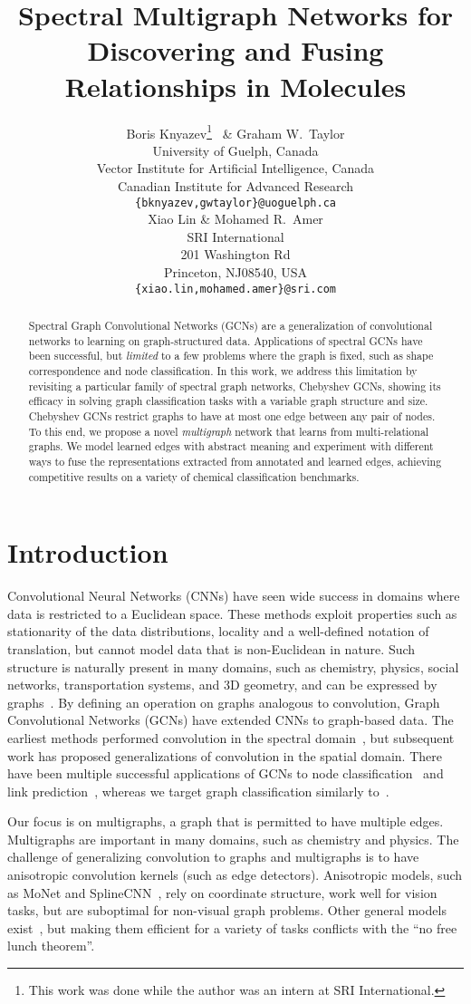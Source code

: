 \documentclass[final,nonatbib]{article} \usepackage{nips_2018}
\title{Spectral Multigraph Networks for Discovering and Fusing Relationships in Molecules}
\author{Boris Knyazev\thanks{This work was done while the author was an intern at SRI International.}  \  \& Graham W.~Taylor\\
	University of Guelph, Canada \\
	Vector Institute for Artificial Intelligence, Canada \\
	Canadian Institute for Advanced Research\\
	\texttt{\{bknyazev,gwtaylor\}@uoguelph.ca} \\
	\And
	Xiao Lin \& Mohamed R.~Amer \\
	SRI International \\
	201 Washington Rd\\
	Princeton, NJ08540, USA\\
	\texttt{\{xiao.lin,mohamed.amer\}@sri.com}
}
\begin{document}
	\maketitle
\begin{abstract}
		Spectral Graph Convolutional Networks (GCNs) are a generalization of convolutional networks to learning on graph-structured data.
Applications of spectral GCNs have been successful, but \textit{limited} to a few problems where the graph is fixed, such as shape correspondence and node classification. In this work, we address this limitation by revisiting a particular family of spectral graph networks, Chebyshev GCNs, showing its efficacy in solving graph classification tasks with a variable graph structure and size. Chebyshev GCNs restrict graphs to have at most one edge between any pair of nodes. To this end, we propose a novel \textit{multigraph} network that learns from multi-relational graphs. We model learned edges with abstract meaning and experiment with different ways to fuse the representations extracted from annotated and learned edges, achieving competitive results on a variety of chemical classification benchmarks.
	\end{abstract}
\section{Introduction}\label{sec:intro}
	Convolutional Neural Networks (CNNs) have seen wide success in domains where data is restricted to a Euclidean space. These methods exploit properties such as stationarity of the data distributions, locality and a well-defined notation of translation, but cannot model data that is non-Euclidean in nature. Such structure is naturally present in many domains, such as chemistry, physics, social networks, transportation systems, and 3D geometry, and can be expressed by graphs~\cite{bronstein2017geometric, hamilton2017representation}. By defining an operation on graphs analogous to convolution, Graph Convolutional Networks (GCNs) have extended CNNs to graph-based data. The earliest methods performed convolution in the spectral domain~\cite{bruna2013spectral}, but subsequent work has proposed generalizations of convolution in the spatial domain. There have been multiple successful applications of GCNs to node classification~\cite{velickovic2017graph} and link prediction~\cite{schlichtkrull2018modeling}, whereas we target graph classification similarly to~\cite{simonovsky2017dynamic}.

	Our focus is on multigraphs, a graph that is permitted to have multiple edges. Multigraphs are important in many domains, such as chemistry and physics.
	The challenge of generalizing convolution to graphs and multigraphs is to have anisotropic convolution kernels (such as edge detectors). Anisotropic models, such as MoNet \cite{monti2017geometric} and SplineCNN~\cite{fey2018splinecnn}, rely on coordinate structure, work well for vision tasks, but are suboptimal for non-visual graph problems. Other general models exist~\cite{gilmer2017neural, battaglia2018relational}, but making them efficient for a variety of tasks conflicts with the ``no free lunch theorem''.
\end{document}
